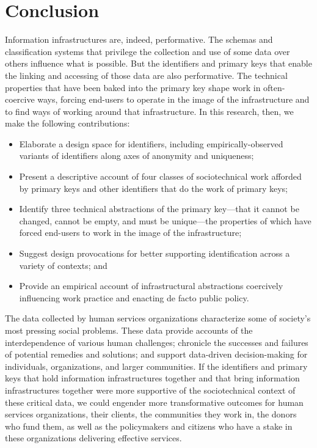 \section{Conclusion}
Information infrastructures are, indeed, performative. The schemas and classification systems that privilege the collection and use of some data over others influence what is possible. But the identifiers and primary keys that enable the linking and accessing of those data are also performative. The technical properties that have been baked into the primary key shape work in often-coercive ways, forcing end-users to operate in the image of the infrastructure and to find ways of working around that infrastructure. In this research, then, we make the following contributions:

\begin{itemize}
\item Elaborate a design space for identifiers, including empirically-observed variants of identifiers along axes of anonymity and uniqueness;
\item Present a descriptive account of four classes of sociotechnical work afforded by primary keys and other identifiers that do the work of primary keys;
\item Identify three technical abstractions of the primary key---that it cannot be changed, cannot be empty, and must be unique---the properties of which have forced end-users to work in the image of the infrastructure;
\item Suggest design provocations for better supporting identification across a variety of contexts; and
\item Provide an empirical account of infrastructural abstractions coercively influencing work practice and enacting de facto public policy.
\end{itemize}

The data collected by human services organizations characterize some of society's most pressing social problems. These data provide accounts of the interdependence of various human challenges; chronicle the successes and failures of potential remedies and solutions; and support data-driven decision-making for individuals, organizations, and larger communities. If the identifiers and primary keys that hold information infrastructures together and that bring information infrastructures together were more supportive of the sociotechnical context of these critical data, we could engender more transformative outcomes for human services organizations, their clients, the communities they work in, the donors who fund them, as well as the policymakers and citizens who have a stake in these organizations delivering effective services. 